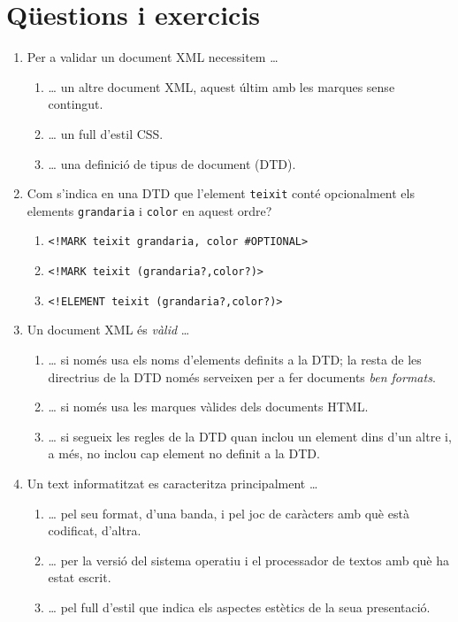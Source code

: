 \section{Qüestions i exercicis}
\begin{enumerate}
\item Per a validar un document XML necessitem {\ldots}
  \begin{enumerate}
  \item {\ldots} un altre document XML, aquest últim amb les marques
    sense contingut.
  \item {\ldots} un full d'estil CSS.
  \item {\ldots} una definició de tipus de document (DTD).
  \end{enumerate}

\item Com s'indica en una DTD que l'element \texttt{teixit} conté
  opcionalment els elements \texttt{grandaria} i \texttt{color} en
  aquest ordre?
  \begin{enumerate}
  \item \verb|<!MARK teixit grandaria, color #OPTIONAL>|
  \item \verb|<!MARK teixit (grandaria?,color?)>|
  \item \verb|<!ELEMENT teixit (grandaria?,color?)>|
  \end{enumerate}

\item Un document XML és \emph{vàlid} {\ldots}
  \begin{enumerate}
  \item {\ldots} si només usa els noms d'elements definits a la DTD;
    la resta de les directrius de la DTD només serveixen per a fer
    documents \emph{ben formats}.
  \item {\ldots} si només usa les marques vàlides dels documents HTML.
  \item {\ldots} si segueix les regles de la DTD quan inclou un
    element dins d'un altre i, a més, no inclou cap element no definit
    a la DTD.
\end{enumerate}

\item Un text informatitzat es caracteritza principalment {\ldots}
  \begin{enumerate}
  \item {\ldots} pel seu format, d'una banda, i pel joc de caràcters
    amb què està codificat, d'altra.
  \item {\ldots} per la versió del sistema operatiu i el processador
    de textos amb què ha estat escrit.
  \item {\ldots} pel full d'estil que indica els aspectes estètics de
    la seua presentació.
\end{enumerate}


\end{enumerate}

